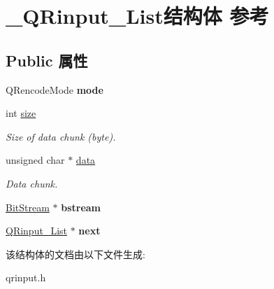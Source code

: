 \hypertarget{struct___q_rinput___list}{\section{\-\_\-\-Q\-Rinput\-\_\-\-List结构体 参考}
\label{struct___q_rinput___list}
}
\subsection*{Public 属性}
\begin{DoxyCompactItemize}
\item 
\hypertarget{struct___q_rinput___list_a970bb9bf1b6fecea98c8cce84ad50743}{Q\-Rencode\-Mode {\bfseries mode}}\label{struct___q_rinput___list_a970bb9bf1b6fecea98c8cce84ad50743}

\item 
\hypertarget{struct___q_rinput___list_a0e95d1f205d72e7f8ed60d0f3c612b7d}{int \hyperlink{struct___q_rinput___list_a0e95d1f205d72e7f8ed60d0f3c612b7d}{size}}\label{struct___q_rinput___list_a0e95d1f205d72e7f8ed60d0f3c612b7d}

\begin{DoxyCompactList}\small\item\em Size of data chunk (byte). \end{DoxyCompactList}\item 
\hypertarget{struct___q_rinput___list_ab1b2193ef5cbbc3ebac66c403c1e0d86}{unsigned char $\ast$ \hyperlink{struct___q_rinput___list_ab1b2193ef5cbbc3ebac66c403c1e0d86}{data}}\label{struct___q_rinput___list_ab1b2193ef5cbbc3ebac66c403c1e0d86}

\begin{DoxyCompactList}\small\item\em Data chunk. \end{DoxyCompactList}\item 
\hypertarget{struct___q_rinput___list_ac5218ca09695bf13a42f7f18e9bf1d33}{\hyperlink{struct_bit_stream}{Bit\-Stream} $\ast$ {\bfseries bstream}}\label{struct___q_rinput___list_ac5218ca09695bf13a42f7f18e9bf1d33}

\item 
\hypertarget{struct___q_rinput___list_a1f23d7348d94cb4107c57cd351e4a00c}{\hyperlink{struct___q_rinput___list}{Q\-Rinput\-\_\-\-List} $\ast$ {\bfseries next}}\label{struct___q_rinput___list_a1f23d7348d94cb4107c57cd351e4a00c}

\end{DoxyCompactItemize}


该结构体的文档由以下文件生成\-:\begin{DoxyCompactItemize}
\item 
qrinput.\-h\end{DoxyCompactItemize}
